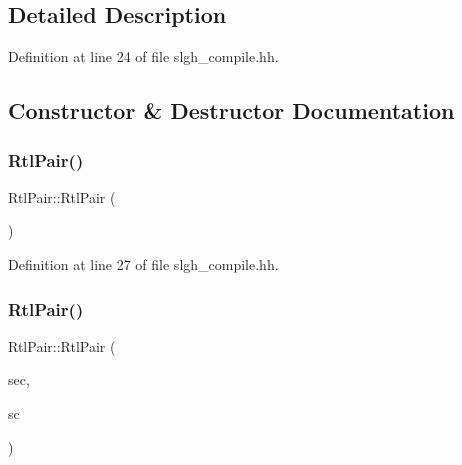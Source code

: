 \subsection{Detailed Description}


Definition at line 24 of file slgh\+\_\+compile.\+hh.



\subsection{Constructor \& Destructor Documentation}
\mbox{\label{struct_rtl_pair_a4aae3ffbbdc84e9843c001533b685c81}} 
\subsubsection{\texorpdfstring{RtlPair()}{RtlPair()}\hspace{0.1cm}{\footnotesize\ttfamily [1/2]}}
{\footnotesize\ttfamily Rtl\+Pair\+::\+Rtl\+Pair (\begin{DoxyParamCaption}\item[{void}]{ }\end{DoxyParamCaption})\hspace{0.3cm}{\ttfamily [inline]}}



Definition at line 27 of file slgh\+\_\+compile.\+hh.

\mbox{\label{struct_rtl_pair_ae0e978d12f04656959f99f57a8921ade}} 
\subsubsection{\texorpdfstring{RtlPair()}{RtlPair()}\hspace{0.1cm}{\footnotesize\ttfamily [2/2]}}
{\footnotesize\ttfamily Rtl\+Pair\+::\+Rtl\+Pair (\begin{DoxyParamCaption}\item[{\mbox{\hyperlink{class_construct_tpl}{Construct\+Tpl}} $\ast$}]{sec,  }\item[{\mbox{\hyperlink{class_symbol_scope}{Symbol\+Scope}} $\ast$}]{sc }\end{DoxyParamCaption})\hspace{0.3cm}{\ttfamily [inline]}}



